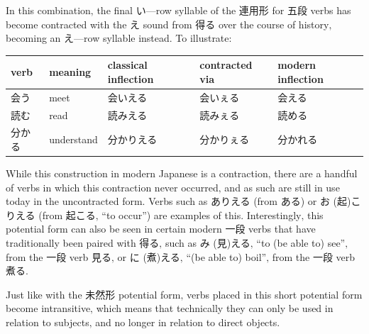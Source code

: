 \documentclass[11pt, b5paper, twoside, openright, onecolumn]{book}
\makeatletter
\newcommand*{\rubystack}[2]{{\relscale{0.5}%
  \begin{tabular}[b]{@{}c@{}}%
    {#1}\\%
   {\textscale{2}{#2}}%
  \end{tabular}}%
}
\DeclareRobustCommand*{\ruby}[2]{%
  \mbox{%
    \setlength{\parskip}{0ex}%
    \BeginAccSupp{method=pdfstringdef,ActualText={#1}}%
      \rubystack{\phantom{#2}}{#1}%
      \llap{%
        \rubystack{#2}{\phantom{#1}}%
      }%
    \EndAccSupp{}%
  }%
}
\renewcommand*{\ruby}[2]{#2 (#1)}%
\newenvironment{mytabularcentered}[1]{\noindent
\begin{center}\begin{tabular}[h]{#1}}{\end{tabular}\end{center}}
\makeatother
\begin{document}
In this combination‚ the final い—row syllable of the 連用形 for 五段 verbs has become contracted with the え sound from 得る over the course of history‚ becoming an え—row syllable instead. To illustrate:

\vspace{0.5cm}
\smaller
\begin{center}
\begin{mytabularcentered}{| l  l  l  l  l |}\hline 
\rule{0pt}{2.4ex}verb & meaning & \index[english]{Classical potential}classical inflection & contracted via & modern inflection\\ 
\hline
\rule{0pt}{2.4ex}会う & meet & 会いえる & 会いぇる & 会える\\ 
\rule{0pt}{2.4ex}読む & read & 読みえる & 読みぇる & 読める\\ 
\rule{0pt}{2.4ex}分かる & understand & 分かりえる & 分かりぇる & 分かれる\\ 
\hline 
\end{mytabularcentered}
\end{center}
\larger
\vspace{0.5cm}


While this construction in modern Japanese is a contraction‚ there are a handful of verbs in which this contraction never occurred‚ and as such are still in use today in the uncontracted form. Verbs such as ありえる (from ある) or \ruby{起}{お}こりえる (from 起こる‚ “to occur”) are examples of this. Interestingly‚ this potential form can also be seen in certain modern 一段 verbs that have traditionally been paired with 得る‚ such as \ruby{見}{み}える‚ “to (be able to) see”‚ from the 一段 verb 見る‚ or \ruby{煮}{に}える‚ “(be able to) boil”‚ from the 一段 verb 煮る.

Just like with the 未然形 potential form‚ verbs placed in this short potential form become intransitive‚ which means that technically they can only be used in relation to subjects‚ and no longer in relation to direct objects.
\end{document}
